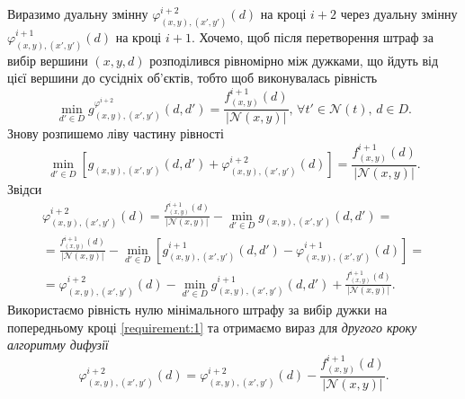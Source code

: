 Виразимо дуальну змінну
$\varphi_{\left(x, y \right), \left(x', y' \right)}^{i + 2} \left( d \right)$
на кроці $i + 2$ через дуальну змінну
$\varphi_{\left(x, y \right), \left(x', y' \right)}^{i + 1} \left( d \right)$
на кроці $i + 1$.
Хочемо, щоб після перетворення штраф за вибір вершини $\left(x, y, d \right)$
розподілився рівномірно між дужками,
що йдуть від цієї вершини до сусідніх об'єктів, тобто щоб виконувалась рівність
\begin{equation*}
    \min \limits_{d' \in D} g_{\left(x, y \right), \left(x', y' \right)}^{\varphi^{i + 2}}
    \left(
        d, d'
    \right) =
    \frac{f_{\left(x, y \right)}^{i + 1} \left(d \right)}{\left| \mathcal{N} \left( x, y \right) \right|}, \,
    \forall t' \in \mathcal{N} \left(t \right), \,
    d \in D.
\end{equation*}
Знову розпишемо ліву частину рівності
\begin{equation*}
    \min \limits_{d' \in D} \left[
        g_{\left(x, y \right), \left(x', y' \right)} \left( d, d' \right) +
        \varphi_{\left(x, y \right), \left(x', y' \right)}^{i + 2} \left(d \right)
    \right] =
    \frac{f_{\left(x, y \right)}^{i + 1} \left(d \right)}{\left| \mathcal{N} \left( x, y \right) \right|}.
\end{equation*}
Звідси
\begin{equation*}
\begin{gathered}
    \varphi_{\left(x, y \right), \left(x', y' \right)}^{i + 2} \left(d \right) =
    \frac{f_{\left(x, y \right)}^{i + 1} \left(d \right)}{\left| \mathcal{N} \left( x, y \right) \right|} -
    \min \limits_{d' \in D}
        g_{\left(x, y \right), \left(x', y' \right)} \left( d, d' \right) = \\
    = \frac{f_{\left(x, y \right)}^{i + 1} \left(d \right)}{\left| \mathcal{N} \left( x, y \right) \right|} -
    \min \limits_{d' \in D} \left[
        g_{\left(x, y \right), \left(x', y' \right)}^{i + 1} \left( d, d' \right) -
        \varphi_{\left(x, y \right), \left(x', y' \right)}^{i + 1} \left(d \right)
    \right] = \\
    = \varphi_{\left(x, y \right), \left(x', y' \right)}^{i + 2} \left(d \right) -
    \min \limits_{d' \in D}
        g_{\left(x, y \right), \left(x', y' \right)}^{i + 1} \left( d, d' \right) +
    \frac{f_{\left(x, y \right)}^{i + 1} \left(d \right)}{\left| \mathcal{N} \left( x, y \right) \right|}.
\end{gathered}
\end{equation*}
Використаємо рівність нулю
мінімального штрафу за вибір дужки на попередньому кроці \eqref{requirement:1}
та отримаємо вираз для \textit{другого кроку алгоритму дифузії}
\begin{equation*}
    \varphi_{\left(x, y \right), \left(x', y' \right)}^{i + 2} \left(d \right) =
    \varphi_{\left(x, y \right), \left(x', y' \right)}^{i + 2} \left(d \right) -
    \frac{f_{\left(x, y \right)}^{i + 1} \left(d \right)}{\left| \mathcal{N} \left( x, y \right) \right|}.
\end{equation*}

